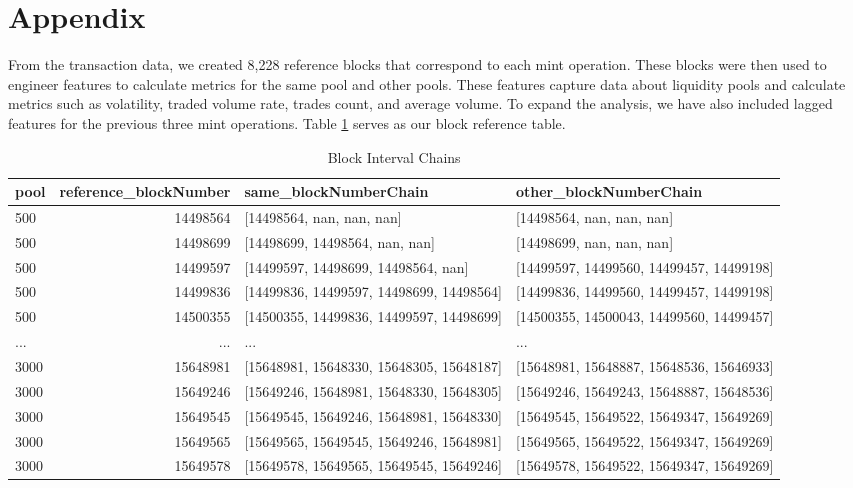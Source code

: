 \documentclass{article}
\begin{document}
\section*{Appendix}

From the transaction data, we created 8,228 reference blocks that correspond to each mint operation. These blocks were then used to engineer features to calculate metrics for the same pool and other pools. These features capture data about liquidity pools and calculate metrics such as volatility, traded volume rate, trades count, and average volume. To expand the analysis, we have also included lagged features for the previous three mint operations. Table \ref{table:chains} serves as our block reference table.
\begin{table}[htbp]
  \centering
  \small
  \begin{tabularx}{\linewidth}{|X|r|l|l|}
    \hline
    \textbf{pool} & \textbf{reference\_blockNumber} & \textbf{same\_blockNumberChain} & \textbf{other\_blockNumberChain} \\
    \hline
    500 & 14498564 & [14498564, nan, nan, nan] & [14498564, nan, nan, nan] \\
    500 & 14498699 & [14498699, 14498564, nan, nan] & [14498699, nan, nan, nan] \\
    500 & 14499597 & [14499597, 14498699, 14498564, nan] & [14499597, 14499560, 14499457, 14499198] \\
    500 & 14499836 & [14499836, 14499597, 14498699, 14498564] & [14499836, 14499560, 14499457, 14499198] \\
    500 & 14500355 & [14500355, 14499836, 14499597, 14498699] & [14500355, 14500043, 14499560, 14499457] \\
    ... & ... & ... & ... \\
    3000 & 15648981 & [15648981, 15648330, 15648305, 15648187] & [15648981, 15648887, 15648536, 15646933] \\
    3000 & 15649246 & [15649246, 15648981, 15648330, 15648305] & [15649246, 15649243, 15648887, 15648536] \\
    3000 & 15649545 & [15649545, 15649246, 15648981, 15648330] & [15649545, 15649522, 15649347, 15649269] \\
    3000 & 15649565 & [15649565, 15649545, 15649246, 15648981] & [15649565, 15649522, 15649347, 15649269] \\
    3000 & 15649578 & [15649578, 15649565, 15649545, 15649246] & [15649578, 15649522, 15649347, 15649269] \\
    \hline
  \end{tabularx}
  \caption{Block Interval Chains}
  \label{table:chains}
\end{table}
\end{document}
